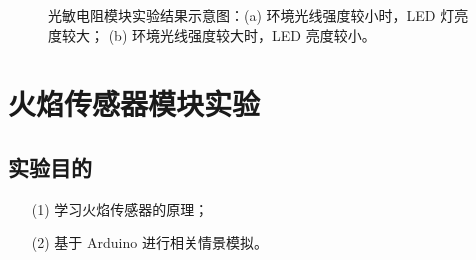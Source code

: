 \documentclass[UTF8, oneside]{ctexbook}
\begin{document}
\begin{figure}[h]
    \centering


    \centering
    \caption{光敏电阻模块实验结果示意图：(a) 环境光线强度较小时，LED 灯亮度较大；
    (b) 环境光线强度较大时，LED 亮度较小。}
    \label{s8_1}
    
\end{figure}





\chapter{火焰传感器模块实验}
\section{实验目的}
\begin{itemize}
    \item[(1)] 学习火焰传感器的原理；
    \item[(2)] 基于 Arduino 进行相关情景模拟。
\end{itemize}
\end{document}

